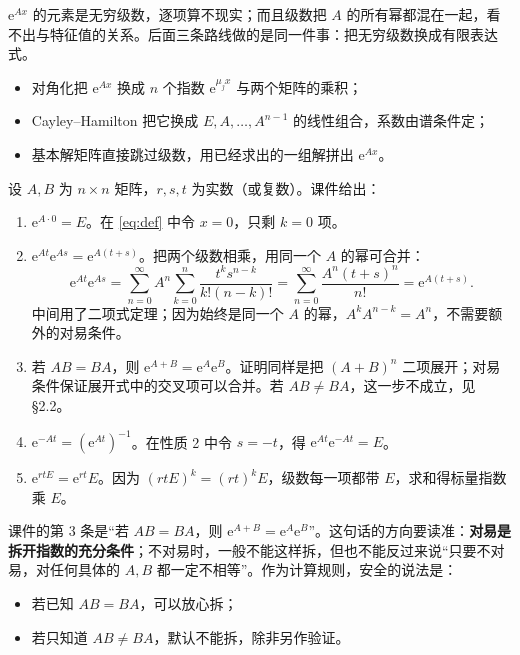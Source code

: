 \documentclass[11pt]{ctexart}
\let\basesubhdr\subhdr
\renewcommand{\subhdr}[1]{\needspace{8\baselineskip}\basesubhdr{#1}}
\let\basehdr\hdr
\renewcommand{\hdr}[2]{\needspace{11\baselineskip}\basehdr{#1}{#2}}
\newcommand{\ee}{\mathrm{e}}
\begin{document}

$\ee^{Ax}$ 的元素是无穷级数，逐项算不现实；而且级数把 $A$ 的所有幂都混在一起，看不出与特征值的关系。后面三条路线做的是同一件事：把无穷级数换成有限表达式。
\begin{itemize}
  \item 对角化把 $\ee^{Ax}$ 换成 $n$ 个指数 $\ee^{\mu_jx}$ 与两个矩阵的乘积；
  \item Cayley--Hamilton 把它换成 $E,A,\dots,A^{n-1}$ 的线性组合，系数由谱条件定；
  \item 基本解矩阵直接跳过级数，用已经求出的一组解拼出 $\ee^{Ax}$。
\end{itemize}



设 $A,B$ 为 $n\times n$ 矩阵，$r,s,t$ 为实数（或复数）。课件给出：
\begin{enumerate}
  \item $\ee^{A\cdot0}=E$。在 \eqref{eq:def} 中令 $x=0$，只剩 $k=0$ 项。
  \item $\ee^{At}\ee^{As}=\ee^{A(t+s)}$。把两个级数相乘，用同一个 $A$ 的幂可合并：
  \[
  \ee^{At}\ee^{As}
  =\sum_{n=0}^{\infty}A^n\sum_{k=0}^{n}\frac{t^k s^{n-k}}{k!(n-k)!}
  =\sum_{n=0}^{\infty}\frac{A^n(t+s)^n}{n!}
  =\ee^{A(t+s)}.
  \]
  中间用了二项式定理；因为始终是同一个 $A$ 的幂，$A^kA^{n-k}=A^n$，不需要额外的对易条件。
  \item 若 $AB=BA$，则 $\ee^{A+B}=\ee^{A}\ee^{B}$。证明同样是把 $(A+B)^n$ 二项展开；对易条件保证展开式中的交叉项可以合并。若 $AB\ne BA$，这一步不成立，见 §2.2。
  \item $\ee^{-At}=(\ee^{At})^{-1}$。在性质 2 中令 $s=-t$，得 $\ee^{At}\ee^{-At}=E$。
  \item $\ee^{rtE}=\ee^{rt}E$。因为 $(rtE)^k=(rt)^kE$，级数每一项都带 $E$，求和得标量指数乘 $E$。
\end{enumerate}


课件的第 3 条是“若 $AB=BA$，则 $\ee^{A+B}=\ee^{A}\ee^{B}$”。这句话的方向要读准：\textbf{对易是拆开指数的充分条件}；不对易时，一般不能这样拆，但也不能反过来说“只要不对易，对任何具体的 $A,B$ 都一定不相等”。作为计算规则，安全的说法是：

\begin{itemize}
  \item 若已知 $AB=BA$，可以放心拆；
  \item 若只知道 $AB\ne BA$，默认不能拆，除非另作验证。
\end{itemize}
\end{document}
